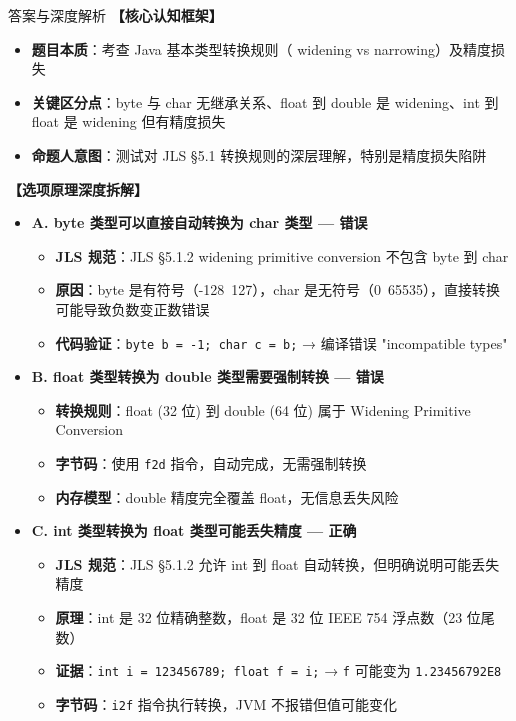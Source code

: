 \documentclass[12pt, a4paper]{ctexart}
\newcommand{\code}[1]{\texttt{#1}}
\begin{document}
\begin{enumerate}[label=\textbf{\arabic*.}, leftmargin=*, itemsep=1.5em]
\begin{bluebox}{答案与深度解析}
		      \textbf{【核心认知框架】}
		      \begin{itemize}[leftmargin=*, nosep]
			      \item \textbf{题目本质}：考查 Java 基本类型转换规则（ widening vs narrowing）及精度损失
			      \item \textbf{关键区分点}：byte 与 char 无继承关系、float 到 double 是 widening、int 到 float 是 widening 但有精度损失
			      \item \textbf{命题人意图}：测试对 JLS §5.1 转换规则的深层理解，特别是精度损失陷阱
		      \end{itemize}

		      \textbf{【选项原理深度拆解】}
		      \begin{itemize}[leftmargin=*, nosep]
			      \item \textbf{A. byte 类型可以直接自动转换为 char 类型 — 错误}
			            \begin{itemize}[leftmargin=*, nosep]
				            \item \textbf{JLS 规范}：JLS §5.1.2  widening primitive conversion 不包含 byte 到 char
				            \item \textbf{原因}：byte 是有符号（-128~127），char 是无符号（0~65535），直接转换可能导致负数变正数错误
				            \item \textbf{代码验证}：\code{byte b = -1; char c = b;} → 编译错误 "incompatible types"
			            \end{itemize}

			      \item \textbf{B. float 类型转换为 double 类型需要强制转换 — 错误}
			            \begin{itemize}[leftmargin=*, nosep]
				            \item \textbf{转换规则}：float (32 位) 到 double (64 位) 属于 Widening Primitive Conversion
				            \item \textbf{字节码}：使用 \code{f2d} 指令，自动完成，无需强制转换
				            \item \textbf{内存模型}：double 精度完全覆盖 float，无信息丢失风险
			            \end{itemize}

			      \item \textbf{C. int 类型转换为 float 类型可能丢失精度 — 正确}
			            \begin{itemize}[leftmargin=*, nosep]
				            \item \textbf{JLS 规范}：JLS §5.1.2 允许 int 到 float 自动转换，但明确说明可能丢失精度
				            \item \textbf{原理}：int 是 32 位精确整数，float 是 32 位 IEEE 754 浮点数（23 位尾数）
				            \item \textbf{证据}：\code{int i = 123456789; float f = i;} → \code{f} 可能变为 \code{1.23456792E8}
				            \item \textbf{字节码}：\code{i2f} 指令执行转换，JVM 不报错但值可能变化
			            \end{itemize}


\end{itemize}
\end{bluebox}
\end{enumerate}
\end{document}
